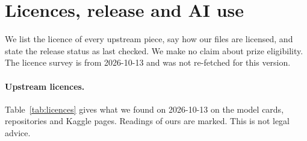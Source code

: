 \section{Licences, release and AI use}\label{app:licences}

We list the licence of every upstream piece, say how our files are licensed, and state the release status as last checked. We make no claim about prize eligibility. The licence survey is from 2026-10-13 and was not re-fetched for this version.

\paragraph{Upstream licences.} Table~\ref{tab:licences} gives what we found on 2026-10-13 on the model cards, repositories and Kaggle pages. Readings of ours are marked. This is not legal advice.

